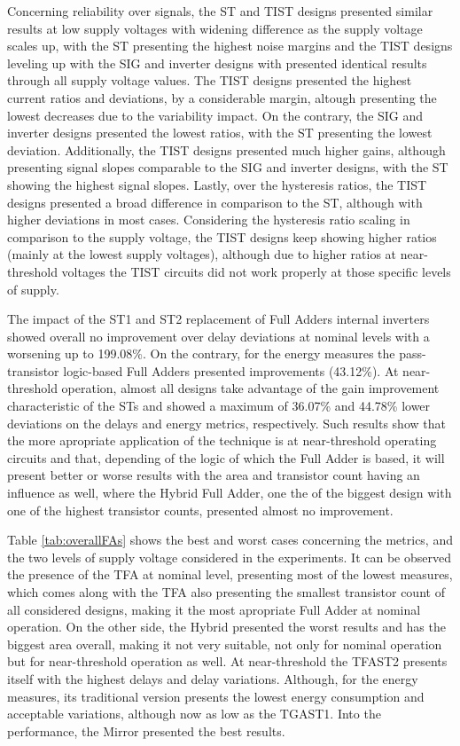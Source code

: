 \documentclass[pgmicro,mestrado,english]{iiufrgs}
\begin{document}
Concerning reliability over signals, the ST and TIST designs presented similar results at low supply voltages with widening difference as the supply voltage scales up, with the ST presenting the highest noise margins and the TIST designs leveling up with the SIG and inverter designs with presented identical results through all supply voltage values. The TIST designs presented the highest current ratios and deviations, by a considerable margin, altough presenting the lowest decreases due to the variability impact. On the contrary, the SIG and inverter designs presented the lowest ratios, with the ST presenting the lowest deviation. Additionally, the TIST designs presented much higher gains, although presenting signal slopes comparable to the SIG and inverter designs, with the ST showing the highest signal slopes. Lastly, over the hysteresis ratios, the TIST designs presented a broad difference in comparison to the ST, although with higher deviations in most cases. Considering the hysteresis ratio scaling in comparison to the supply voltage, the TIST designs keep showing higher ratios (mainly at the lowest supply voltages), although due to higher ratios at near-threshold voltages the TIST circuits did not work properly at those specific levels of supply. 

The impact of the ST1 and ST2 replacement of Full Adders internal inverters showed overall no improvement over delay deviations at nominal levels with a worsening up to 199.08\%. On the contrary, for the energy measures the pass-transistor logic-based Full Adders presented improvements (43.12\%). At near-threshold operation, almost all designs take advantage of the gain improvement characteristic of the STs and showed a maximum of 36.07\% and 44.78\% lower deviations on the delays and energy metrics, respectively. Such results show that the more apropriate application of the technique is at near-threshold operating circuits and that, depending of the logic of which the Full Adder is based, it will present better or worse results with the area and transistor count having an influence as well, where the Hybrid Full Adder, one the of the biggest design with one of the highest transistor counts, presented almost no improvement. 

Table \ref{tab:overallFAs} shows the best and worst cases concerning the metrics, and the two levels of supply voltage considered in the experiments. It can be observed the presence of the TFA at nominal level, presenting most of the lowest measures, which comes along with the TFA also presenting the smallest transistor count of all considered designs, making it the most apropriate Full Adder at nominal operation. On the other side, the Hybrid presented the worst results and has the biggest area overall, making it not very suitable, not only for nominal operation but for near-threshold operation as well. At near-threshold the TFAST2 presents itself with the highest delays and delay variations. Although, for the energy measures, its traditional version presents the lowest energy consumption and acceptable variations, although now as low as the TGAST1. Into the performance, the Mirror presented the best results. 
\end{document}
